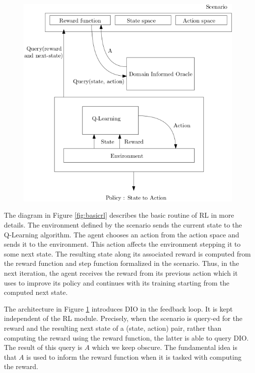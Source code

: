 \begin{figure}[H]
\begin{minipage}{.45\textwidth}
    \includegraphics[width=1\linewidth]{figures/dio.png}
    \label{fig:diorl}
  \end{minipage}
\end{figure}


The diagram in Figure \ref{fig:basicrl} describes the basic routine of RL in more details. The environment defined by the scenario sends the current state 
to the Q-Learning algorithm. The agent chooses an action from the action space and sends it to the environment. This action affects the environment stepping it to some next state. 
The resulting state along its associated reward is computed from the reward function and step function formalized in the scenario. Thus, in the next iteration, the 
agent receives the reward from its previous action which it uses to improve its policy and continues with its training starting from the computed next state.  

\medskip 

The architecture in Figure \ref{fig:diorl} introduces DIO in the feedback loop. It is kept independent of the RL module. Precisely, when the scenario is query-ed for the reward and 
the resulting next state of a (state, action) pair, rather than computing the reward using the reward function, the latter is able to query DIO. The result of this query is $A$ which we keep 
obscure. The fundamental idea is that $A$ is used to inform the reward function when it is tasked with computing the reward. 

